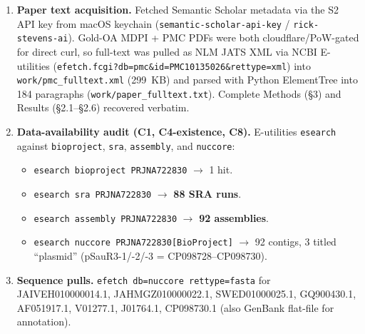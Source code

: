 \documentclass[11pt]{article}
\begin{document}
\begin{enumerate}
  \item \textbf{Paper text acquisition.} Fetched Semantic Scholar metadata via
        the S2 API key from macOS keychain
        (\texttt{semantic-scholar-api-key} / \texttt{rick-stevens-ai}). Gold-OA
        MDPI + PMC PDFs were both cloudflare/PoW-gated for direct curl, so
        full-text was pulled as NLM JATS XML via NCBI E-utilities
        (\texttt{efetch.fcgi?db=pmc\&id=PMC10135026\&rettype=xml}) into
        \texttt{work/pmc\_fulltext.xml} (299~KB) and parsed with Python
        ElementTree into 184 paragraphs (\texttt{work/paper\_fulltext.txt}).
        Complete Methods (\S3) and Results (\S2.1--\S2.6) recovered verbatim.

  \item \textbf{Data-availability audit (C1, C4-existence, C8).} E-utilities
        \texttt{esearch} against \texttt{bioproject}, \texttt{sra},
        \texttt{assembly}, and \texttt{nuccore}:
        \begin{itemize}
          \item \texttt{esearch bioproject PRJNA722830} $\rightarrow$ 1 hit.
          \item \texttt{esearch sra PRJNA722830} $\rightarrow$ \textbf{88 SRA runs}.
          \item \texttt{esearch assembly PRJNA722830} $\rightarrow$ \textbf{92 assemblies}.
          \item \texttt{esearch nuccore PRJNA722830[BioProject]} $\rightarrow$
                92 contigs, 3 titled ``plasmid'' (pSauR3-1/-2/-3 = CP098728--CP098730).
        \end{itemize}

  \item \textbf{Sequence pulls.} \texttt{efetch db=nuccore rettype=fasta} for
        JAIVEH010000014.1, JAHMGZ010000022.1, SWED01000025.1, GQ900430.1,
        AF051917.1, V01277.1, J01764.1, CP098730.1 (also GenBank flat-file for annotation).


\end{enumerate}
\end{document}
